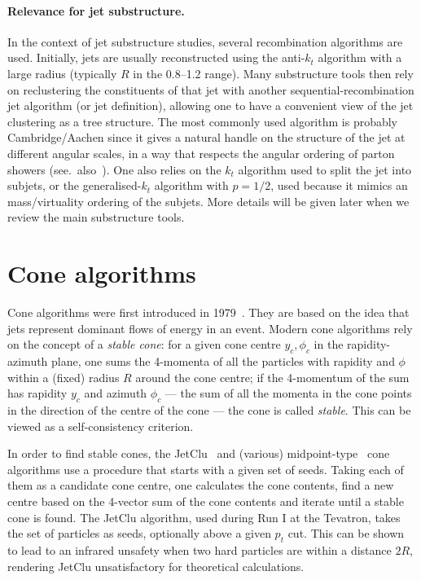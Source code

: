 \paragraph{Relevance for jet substructure.}
%
In the context of jet substructure studies, several recombination
algorithms are used. Initially, jets are usually reconstructed using
the anti-$k_t$ algorithm with a large radius (typically $R$ in the
0.8--1.2 range). Many substructure tools then rely on reclustering the
constituents of that jet with another sequential-recombination jet
algorithm (or jet definition), allowing one to have a convenient view
of the jet clustering as a tree structure.
%
The most commonly used algorithm is probably Cambridge/Aachen since it
gives a natural handle on the structure of the jet at different
angular scales, in a way that respects the angular ordering of parton
showers (see.\ also~\cite{Dreyer:2018nbf}).
%
One also relies on the $k_t$ algorithm used \eg to split the jet into
subjets, or the generalised-$k_t$ algorithm with $p=1/2$, used because
it mimics an mass/virtuality ordering of the subjets.
%
More details will be given later when we review the main substructure
tools.

\section{Cone algorithms}\label{sec:jetalgs-cone}

Cone algorithms were first introduced in
1979~\cite{Sterman:1977wj}. They are based on the
idea that jets represent dominant flows of energy in an event.
%
Modern cone algorithms rely on the concept of a {\em
  stable cone}: for a given cone centre $y_c,\phi_c$ in the
rapidity-azimuth plane, one sums the 4-momenta of all the particles
with rapidity and $\phi$ within a (fixed) radius $R$ around the cone
centre; if the 4-momentum of the sum has rapidity $y_c$ and
azimuth $\phi_c$ --- \ie the sum of all the momenta in the cone points
in the direction of the centre of the cone --- the cone is called {\em
  stable}.
%
This can be viewed as a self-consistency criterion.

In order to find stable cones, the JetClu~\cite{Abe:1991ui} and
(various) midpoint-type~\cite{Blazey:2000qt,Abazov:2011vi} cone
algorithms use a procedure that starts with a given set of
seeds. Taking each of them as a candidate cone centre, one calculates
the cone contents, find a new centre based on the 4-vector sum of the
cone contents and iterate until a stable cone is found.
%
The JetClu algorithm, used during Run I at the Tevatron, takes the set
of particles as seeds, optionally above a given $p_t$ cut. This can be
shown to lead to an infrared unsafety when two hard particles are
within a distance $2R$, rendering JetClu unsatisfactory for theoretical
calculations.

